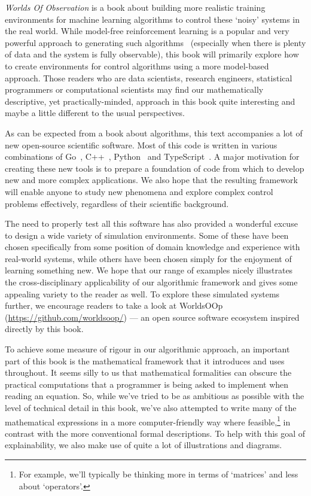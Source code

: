 \documentclass{book}
\begin{document}
\emph{Worlds Of Observation} is a book about building more realistic training environments for machine learning algorithms to control these `noisy' systems in the real world. While model-free reinforcement learning is a popular and very powerful approach to generating such algorithms~\cite{sutton2018reinforcement} (especially when there is plenty of data and the system is fully observable), this book will primarily explore how to create environments for control algorithms using a more model-based approach. Those readers who are data scientists, research engineers, statistical programmers or computational scientists may find our mathematically descriptive, yet practically-minded, approach in this book quite interesting and maybe a little different to the usual perspectives.

As can be expected from a book about algorithms, this text accompanies a lot of new open-source scientific software. Most of this code is written in various combinations of Go~\cite{golang}, C++~\cite{c++lang}, Python~\cite{pythonlang} and TypeScript~\cite{typescriptlang}. A major motivation for creating these new tools is to prepare a foundation of code from which to develop new and more complex applications. We also hope that the resulting framework will enable anyone to study new phenomena and explore complex control problems effectively, regardless of their scientific background.

The need to properly test all this software has also provided a wonderful excuse to design a wide variety of simulation environments. Some of these have been chosen specifically from some position of domain knowledge and experience with real-world systems, while others have been chosen simply for the enjoyment of learning something new. We hope that our range of examples nicely illustrates the cross-disciplinary applicability of our algorithmic framework and gives some appealing variety to the reader as well. To explore these simulated systems further, we encourage readers to take a look at WorldsOOp (\href{https://github.com/worldsoop/}{https://github.com/worldsoop/}) --- an open source software ecosystem inspired directly by this book.

To achieve some measure of rigour in our algorithmic approach, an important part of this book is the mathematical framework that it introduces and uses throughout. It seems silly to us that mathematical formalities can obscure the practical computations that a programmer is being asked to implement when reading an equation. So, while we've tried to be as ambitious as possible with the level of technical detail in this book, we've also attempted to write many of the mathematical expressions in a more computer-friendly way where feasible,\footnote{For example, we'll typically be thinking more in terms of `matrices' and less about `operators'.} in contrast with the more conventional formal descriptions. To help with this goal of explainability, we also make use of quite a lot of illustrations and diagrams.
\end{document}
